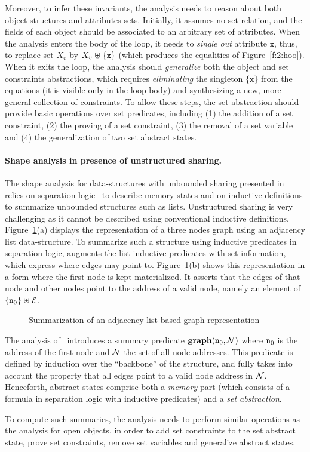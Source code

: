 Moreover, to infer these invariants, the analysis needs to reason
about both object structures and attributes sets.
Initially, it assumes no set relation, and the fields of
each object should be associated to an arbitrary set of attributes.
When the analysis enters the body of the loop, it needs to
{\em single out} attribute \( \mathtt{x} \), thus, to replace set
\( X_v \) by \( X_v \mathrel{\uplus} \{ \mathtt{x} \} \) (which produces the
equalities of Figure~\ref{f:2:hoo}).
When it exits the loop, the analysis should {\em generalize}
both the object and set constraints abstractions, which requires
{\em eliminating} the singleton \( \{ \mathtt{x} \} \) from the
equations (it is visible only in the loop body) and synthesizing
a new, more general collection of constraints.
To allow these steps, the set abstraction should provide basic operations
over set predicates, including (1) the addition of a set constraint, (2)
the proving of a set constraint, (3) the removal of a set variable and
(4) the generalization of two set abstract states.

\paragraph{Shape analysis in presence of unstructured sharing.}
The shape analysis for data-structures with unbounded sharing presented
in~\cite{memcad:15:sas} relies on separation logic~\cite{r:lics:02} to
describe memory states and on inductive definitions to summarize
unbounded structures such as lists.
Unstructured sharing is very challenging as it cannot be described using
conventional inductive definitions.
Figure~\ref{f:3:memcad}(a) displays the representation of a three nodes
graph using an adjacency list data-structure.
To summarize such a structure using inductive predicates in separation
logic, \cite{memcad:15:sas} augments the list inductive
predicates with set information, which express where edges may point to.
Figure~\ref{f:3:memcad}(b) shows this representation in
a form where the first node is kept materialized.
It asserts that the edges of that node and other nodes
point to the address of a valid node, namely an element of \( \{ \texttt{n}_{0}
\} \mathrel{\uplus} \mathcal{E} \).
\begin{figure}[t]
  \newcommand{\picscale}{0.9}
  \begin{center}
    \tikzpics{\picscale}{memcad-inv}
  \end{center}
  \caption{Summarization of an adjacency list-based graph representation}
  \label{f:3:memcad}
\end{figure}
The analysis of~\cite{memcad:15:sas} introduces a summary predicate
\( \textbf{graph}( \texttt{n}_{0}, \mathcal{N} ) \) where \( \texttt{n}_{0} \) is the
address of the first node and \( \mathcal{N} \) the set of all node addresses.
This predicate is defined by induction over the ``backbone'' of the
structure, and fully takes into account the property that all edges
point to a valid node address in \( \mathcal{N} \).
Henceforth, abstract states comprise both a {\em memory} part (which
consists of a formula in separation logic with inductive predicates)
and a {\em set abstraction}.

To compute such summaries, the analysis needs to perform similar
operations as the analysis for open objects, in order to add set
constraints to the set abstract state, prove set constraints,
remove set variables and generalize abstract states.
